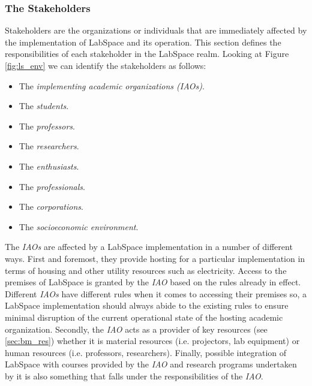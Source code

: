 \documentclass[a4paper, 11pt]{article}
\begin{document}
\subsubsection{The Stakeholders} \label{sec:bm_stakeholders}

Stakeholders are the organizations or individuals that are immediately affected by the implementation of LabSpace and its operation. This section defines the responsibilities of each stakeholder in the LabSpace realm. Looking at Figure \ref{fig:ls_env} we can identify the stakeholders as follows:

\begin{itemize}[noitemsep]
    \item The \textit{implementing academic organizations (IAOs)}.
    \item The \textit{students}.
    \item The \textit{professors}.
    \item The \textit{researchers}.
    \item The \textit{enthusiasts}.
    \item The \textit{professionals}.
    \item The \textit{corporations}.
    \item The \textit{socioeconomic environment}.
\end{itemize}

The \textit{IAOs} are affected by a LabSpace implementation in a number of different ways. First and foremost, they provide hosting for a particular implementation in terms of housing and other utility resources such as electricity. Access to the premises of LabSpace is granted by the \textit{IAO} based on the rules already in effect. Different \textit{IAOs} have different rules when it comes to accessing their premises so, a LabSpace implementation should always abide to the existing rules to ensure minimal disruption of the current operational state of the hosting academic organization. Secondly, the \textit{IAO} acts as a provider of key resources (see \ref{sec:bm_res}) whether it is material resources (i.e. projectors, lab equipment) or human resources (i.e. professors, researchers). Finally, possible integration of LabSpace with courses provided by the \textit{IAO} and research programs undertaken by it is also something that falls under the responsibilities of the \textit{IAO}.
\end{document}
